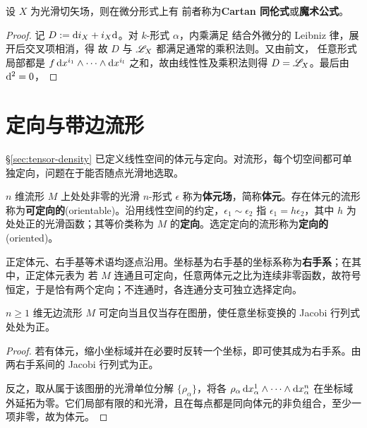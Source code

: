 \begin{theorem}[Cartan]
    设 $X$ 为光滑切矢场，则在微分形式上有
    前者称为\textbf{Cartan 同伦式}或\textbf{魔术公式}。
\end{theorem}
\begin{proof}
    记 $D:=\dd i_X+i_X\dd$。对 $k$-形式 $\alpha$，内乘满足
    结合外微分的 Leibniz 律，展开后交叉项相消，得
    故 $D$ 与 $\mathscr{L}_X$ 都满足通常的乘积法则。又由前文，
    任意形式局部都是 $f\,\dd x^{i_1}\wedge\cdots\wedge\dd x^{i_l}$ 之和，故由线性性及乘积法则得 $D=\mathscr{L}_X$。最后由 $\dd^2=0$，
\end{proof}

\section{定向与带边流形}\label{sec:oriented-manifold}

\S\ref{sec:tensor-density} 已定义线性空间的体元与定向。对流形，每个切空间都可单独定向，问题在于能否随点光滑地选取。

\begin{definition}
    $n$ 维流形 $M$ 上处处非零的光滑 $n$-形式 $\epsilon$ 称为\textbf{体元场}，简称\textbf{体元}。存在体元的流形称为\textbf{可定向的}(orientable)。沿用线性空间的约定，$\epsilon_1\sim\epsilon_2$ 指 $\epsilon_1=h\epsilon_2$，其中 $h$ 为处处正的光滑函数；其等价类称为 $M$ 的\textbf{定向}。选定定向的流形称为\textbf{定向的}(oriented)。
\end{definition}

正定体元、右手基等术语均逐点沿用。坐标基为右手基的坐标系称为\textbf{右手系}；在其中，正定体元表为
若 $M$ 连通且可定向，任意两体元之比为连续非零函数，故符号恒定，于是恰有两个定向；不连通时，各连通分支可独立选择定向。

\begin{theorem}
    $n\geqslant1$ 维无边流形 $M$ 可定向当且仅当存在图册，使任意坐标变换的 Jacobi 行列式处处为正。
\end{theorem}
\begin{proof}
    若有体元，缩小坐标域并在必要时反转一个坐标，即可使其成为右手系。由
    两右手系间的 Jacobi 行列式为正。

    反之，取从属于该图册的光滑单位分解 $\{\rho_\alpha\}$，将各 $\rho_\alpha\,\dd x_\alpha^1\wedge\cdots\wedge\dd x_\alpha^n$ 在坐标域外延拓为零。它们局部有限的和光滑，且在每点都是同向体元的非负组合，至少一项非零，故为体元。
\end{proof}

